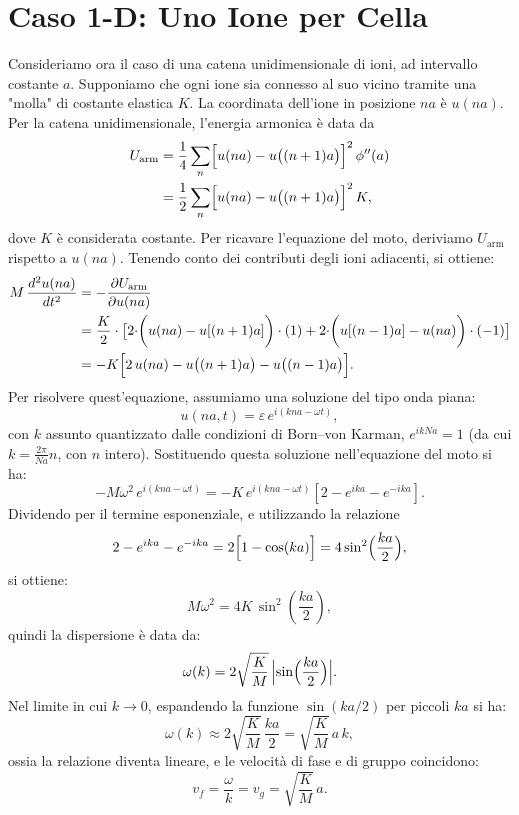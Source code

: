 \section{Caso 1-D: Uno Ione per Cella}
Consideriamo ora il caso di una catena unidimensionale di ioni, ad intervallo costante \(a\). Supponiamo che ogni ione sia connesso al suo vicino tramite una "molla" di costante elastica \(K\). La coordinata dell'ione in posizione \(na\) è \(u(na)\).\\
Per la catena unidimensionale, l'energia armonica è data da
\begin{equation}
\begin{split}
    U_{\text{arm}} &= \frac{1}{4}\sum_{n} \Bigl[ u(na) - u\bigl((n+1)a\bigr) \Bigr]^2\, \phi''(a) \\
    &= \frac{1}{2}\sum_{n} \Bigl[ u(na) - u\bigl((n+1)a\bigr) \Bigr]^2\, K,
\end{split}
\end{equation}
dove \(K\) è considerata costante.
Per ricavare l'equazione del moto, deriviamo \(U_{\text{arm}}\) rispetto a \(u(na)\). Tenendo conto dei contributi degli ioni adiacenti, si ottiene:
\begin{equation}
\begin{split}
    M\,\frac{d^2 u(na)}{dt^2} &= -\frac{\partial U_{\text{arm}}}{\partial u(na)} \\
    &=\frac{K}{2}\cdot \bigl[2\cdot\biggr(u(na)-u[(n+1)a]\biggr)\cdot(1)+2\cdot\biggr(u[(n-1)a]-u(na)\biggr)\cdot(-1)\bigr]\\
    &= -K\Bigl[2\,u(na) - u\bigl((n+1)a\bigr) - u\bigl((n-1)a\bigr)\Bigr].
\end{split}
\end{equation}
Per risolvere quest'equazione, assumiamo una soluzione del tipo onda piana:
\[
u(na,t) = \varepsilon\, e^{i( kna - \omega t)},
\]
con \(k\) assunto quantizzato dalle condizioni di Born--von Karman, \(e^{ikNa} = 1\) (da cui \(k = \frac{2\pi}{Na}n\), con \(n\) intero). Sostituendo questa soluzione nell'equazione del moto si ha:
\[
-M\omega^2\, e^{i( kna-\omega t)} = -K\, e^{i( kna-\omega t)} \left[2 - e^{ika} - e^{-ika}\right].
\]
Dividendo per il termine esponenziale, e utilizzando la relazione
\[
2 - e^{ika} - e^{-ika} = 2\Bigl[1-\cos(ka)\Bigr] = 4\sin^2\Bigl(\frac{ka}{2}\Bigr),
\]
si ottiene:
\[
M\omega^2 = 4K\,\sin^2\left(\frac{ka}{2}\right),
\]
quindi la dispersione è data da:
\[
\omega(k) = 2\sqrt{\frac{K}{M}}\, \Bigl|\sin\Bigl(\frac{ka}{2}\Bigr)\Bigr|.
\]
Nel limite in cui \(k\to 0\), espandendo la funzione \(\sin(ka/2)\) per piccoli \(ka\) si ha:
\[
\omega(k) \approx 2\sqrt{\frac{K}{M}}\,\frac{ka}{2} = \sqrt{\frac{K}{M}}\, a\, k,
\]
ossia la relazione diventa lineare, e le velocità di fase e di gruppo coincidono:
\[
v_f = \frac{\omega}{k} = v_g = \sqrt{\frac{K}{M}}\, a.
\]

